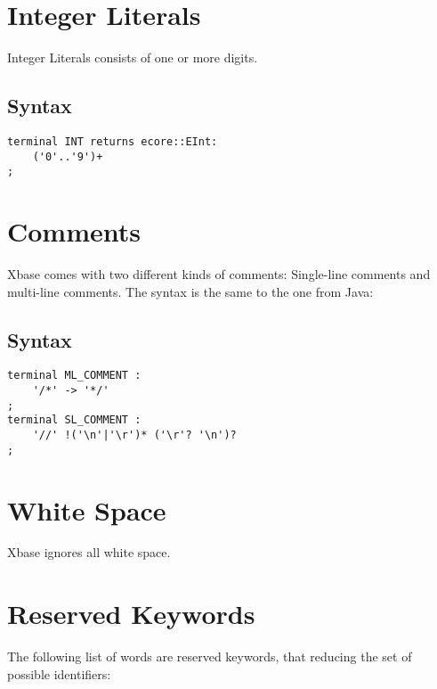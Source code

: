 \documentclass[a4paper,10pt]{scrreprt}
\begin{document}
\section{Integer Literals\label{IntegerLiterals}}
Integer Literals consists of one or more digits.

\subsection{Syntax}
\begin{lstlisting}
terminal INT returns ecore::EInt: 
	('0'..'9')+
;

\end{lstlisting}







\section{Comments\label{Comments}}
Xbase comes with two different kinds of comments: Single-line comments and multi-line comments.
The syntax is the same to the one from Java:

\subsection{Syntax}
\begin{lstlisting}
terminal ML_COMMENT	: 
	'/*' -> '*/'
;
terminal SL_COMMENT : 
	'//' !('\n'|'\r')* ('\r'? '\n')?
;

\end{lstlisting}







\section{White Space\label{Whitespace}}
Xbase ignores all white space.




\section{Reserved Keywords\label{Keywords}}
The following list of words are reserved keywords, that reducing the set of possible identifiers:
\end{document}
